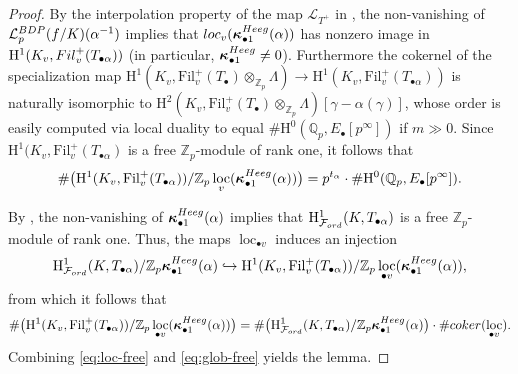 \documentclass[10pt,reqno]{amsart}
\numberwithin{equation}{section}
\theoremstyle{plain}
\theoremstyle{definition}
\theoremstyle{definition}
\theoremstyle{plain}
\theoremstyle{plain}
\theoremstyle{plain}
\theoremstyle{plain}
\theoremstyle{plain}
\theoremstyle{plain}
\newcommand{\Fil}{\mathrm{Fil}}
\newcommand{\al}{\alpha} %
\newcommand{\Z}{\mathbb{Z}}
\newcommand{\Q}{\mathbb{Q}}
\newcommand{\Zp}{\mathbb{Z}_{p}}
\newcommand{\bkappa}{\boldsymbol{\kappa}}
\DeclareMathOperator{\loc}{loc}
\newcommand{\Lcal}{\mathcal{L}}
\newcommand{\Fcal}{\mathcal{F}}
\newcommand{\rH}{\mathrm{H}}
\begin{document}
\begin{proof}
By the interpolation property of the map $\mathscr{L}_{T^+}$ in \cite[Thm.~5.1]{cas-hsieh1}, the non-vanishing of $\Lcal_p^{\rm BDP}(f/K)(\al^{-1})$  implies that ${\rm loc}_v(\bkappa^{\rm Heeg}_{\bullet{1}}(\al))$ has nonzero image in $\rH^1(K_v,{\rm Fil}_v^+(T_{\bullet\al}))$ (in particular, $\boldsymbol{\kappa}_{\bullet{1}}^{\rm Heeg}\neq 0$). 
Furthermore the cokernel of the specialization map $\rH^1(K_v,\Fil_v^+(T_\bullet)\otimes_{\Zp}\Lambda)\rightarrow \rH^1(K_v,\Fil_v^+(T_{\bullet\al}))$ 
is naturally isomorphic to $\rH^2(K_v,\Fil_v^+(T_\bullet)\otimes_{\Zp}\Lambda)[\gamma-\alpha(\gamma)]$, whose order is easily computed via local duality to equal
$\#\rH^0(\Q_p,E_\bullet[p^\infty])$ if $m\gg 0$. Since $\rH^1(K_v,\Fil_v^+(T_{\bullet\al})$ is a free $\Zp$-module of rank one, it follows that
\begin{equation}\label{eq:loc-free}
\#\bigl(\rH^1(K_v,\Fil_v^+(T_{\bullet\al}))/\Zp\loc_v (\bkappa^{\rm Heeg}_{\bullet{1}}(\alpha))\bigr) = p^{t_\alpha}  \cdot\#\rH^0(\Q_p,E_\bullet[p^\infty]).
\end{equation}

By \cite[Thm.~6.1.1]{eisenstein_cyc}, the non-vanishing of $\boldsymbol{\kappa}_{\bullet 1}^{\rm Heeg}(\alpha)$ implies that $\rH^1_{\Fcal_{\rm ord}}(K,T_{\bullet\al})$ is a free $\Z_p$-module of rank one. Thus, the maps $\loc_{\bullet{v}}$ induces an injection 
\[
\rH^1_{\Fcal_{\rm ord}}(K,T_{\bullet\al})/\Zp\bkappa^{\rm Heeg}_{\bullet{1}}(\alpha) \hookrightarrow \rH^1(K_v,\Fil_v^+(T_{\bullet\al}))/\Zp\loc_{\bullet v}(\bkappa^{\rm Heeg}_{\bullet{1}}(\alpha)),
\]
from which it follows that
\begin{equation}\label{eq:glob-free}
\#\bigl(\rH^1(K_v,\Fil_v^+(T_{\bullet\al}))/\Zp\loc_{\bullet v} (\bkappa^{\rm Heeg}_{\bullet 1}(\alpha))\bigr) = \#\bigl(\rH^1_{\Fcal_{\rm ord}}(K,T_{\bullet\al})/\Zp \bkappa^{\rm Heeg}_{\bullet 1}(\alpha)\bigr)\cdot \#{\rm coker}(\loc_{\bullet v}).
\end{equation}
Combining \eqref{eq:loc-free} and \eqref{eq:glob-free} yields the lemma.
\end{proof}
\end{document}

